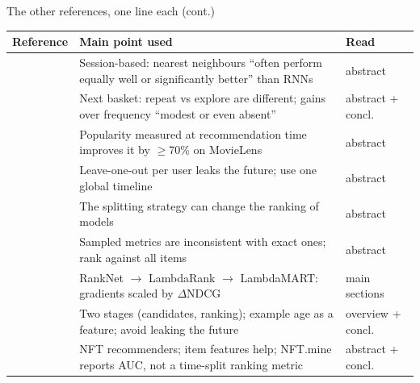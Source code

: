 \documentclass[aspectratio=169,10pt]{beamer}
\newcommand{\toindex}{\hfill\hyperlink{index}{\beamerreturnbutton{index}}}
\begin{document}
\begin{frame}{The other references, one line each (cont.) \toindex}
  \scriptsize
  \renewcommand{\arraystretch}{1.3}
  \begin{tabularx}{\textwidth}{@{}>{\raggedright\arraybackslash}p{2.6cm}>{\raggedright\arraybackslash}X>{\raggedright\arraybackslash}p{2.0cm}@{}}
    \toprule
    Reference & Main point used & Read \\
    \midrule
    \cite{ludewig2018} & Session-based: nearest neighbours ``often perform equally well or significantly better'' than RNNs & abstract \\
    \cite{li2021} & Next basket: repeat vs explore are different; gains over frequency ``modest or even absent'' & abstract + concl. \\
    \cite{ji2020pop} & Popularity measured at recommendation time improves it by $\geq$70\% on MovieLens & abstract \\
    \cite{ji2020leak} & Leave-one-out per user leaks the future; use one global timeline & abstract \\
    \cite{meng2020} & The splitting strategy can change the ranking of models & abstract \\
    \cite{krichene2020} & Sampled metrics are inconsistent with exact ones; rank against all items & abstract \\
    \cite{burges2010} & RankNet $\rightarrow$ LambdaRank $\rightarrow$ LambdaMART: gradients scaled by $\Delta$NDCG & main sections \\
    \cite{covington2016} & Two stages (candidates, ranking); example age as a feature; avoid leaking the future & overview + concl. \\
    \cite{choi2024,nftmine2023} & NFT recommenders; item features help; NFT.mine reports AUC, not a time-split ranking metric & abstract + concl. \\
    \bottomrule
  \end{tabularx}
\end{frame}
\end{document}
